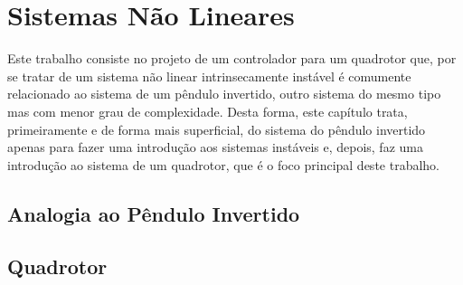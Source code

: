 \chapter{Sistemas Não Lineares}
\label{chap:sistemas-nao-lineares}

Este trabalho consiste no projeto de um controlador para um quadrotor que, por se tratar de um sistema não linear intrinsecamente instável é comumente relacionado ao sistema de um pêndulo invertido, outro sistema do mesmo tipo mas com menor grau de complexidade. Desta forma, este capítulo trata, primeiramente e de forma mais superficial, do sistema do pêndulo invertido apenas para fazer uma introdução aos sistemas instáveis e, depois, faz uma introdução ao sistema de um quadrotor, que é o foco principal deste trabalho.

\section{Analogia ao Pêndulo Invertido}
\label{sec:sistemas-nao-lineares-pendulo}



\section{Quadrotor}
\label{sec:sistemas-nao-lineares-quadrotor}

